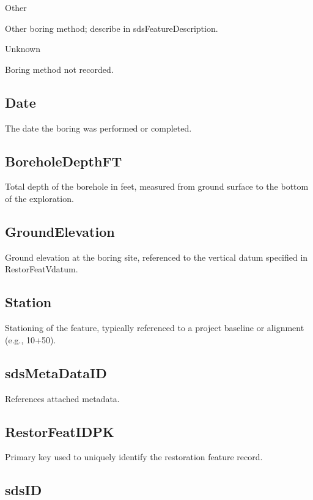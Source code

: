 \documentclass[
  letterpaper,
  DIV=11,
  numbers=noendperiod]{scrreprt}
\begin{document}
Other

Other boring method; describe in sdsFeatureDescription.

Unknown

Boring method not recorded.

\subsection{Date}\label{date}

The date the boring was performed or completed.

\subsection{BoreholeDepthFT}\label{boreholedepthft}

Total depth of the borehole in feet, measured from ground surface to the
bottom of the exploration.

\subsection{GroundElevation}\label{groundelevation}

Ground elevation at the boring site, referenced to the vertical datum
specified in RestorFeatVdatum.

\subsection{Station}\label{station-5}

Stationing of the feature, typically referenced to a project baseline or
alignment (e.g., 10+50).

\subsection{sdsMetaDataID}\label{sdsmetadataid-18}

References attached metadata.

\subsection{RestorFeatIDPK}\label{restorfeatidpk-18}

Primary key used to uniquely identify the restoration feature record.

\subsection{sdsID}\label{sdsid-18}
\end{document}
